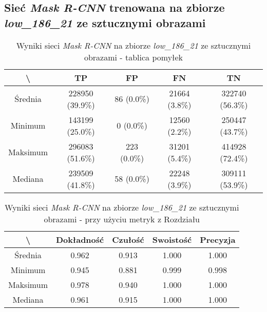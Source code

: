 \subsection{Sieć \textit{Mask R-CNN} trenowana na zbiorze \textit{low\_186\_21} ze sztucznymi obrazami}
\label{sec:results_low_original_generated}

\begin{table}[H]
	\centering
	\caption{Wyniki sieci \textit{Mask R-CNN} na zbiorze \textit{low\_186\_21} ze sztucznymi obrazami - tablica pomyłek}
	\vspace{6pt}
	{\footnotesize
		\begin{tabular}{|c|c|c|c|c|}
      \hline \textbackslash & TP & FP & FN & TN \\
      \hline Średnia & 228950 (39.9\%) & 86 (0.0\%) & 21664 (3.8\%) & 322740 (56.3\%) \\
      \hline Minimum & 143199 (25.0\%) & 0 (0.0\%) & 12560 (2.2\%) & 250447 (43.7\%) \\
      \hline Maksimum & 296083 (51.6\%) & 223 (0.0\%) & 31201 (5.4\%) & 414928 (72.4\%) \\
      \hline Mediana & 239509 (41.8\%) & 58 (0.0\%) & 22248 (3.9\%) & 309111 (53.9\%) \\
      \hline
		\end{tabular}
	}
  \vspace{0pt}
  \label{Tab:low_original_generated}
\end{table}


\begin{table}[H]
	\centering
	\caption{Wyniki sieci \textit{Mask R-CNN} na zbiorze \textit{low\_186\_21} ze sztucznymi obrazami - przy użyciu metryk z Rozdziału }
	\vspace{6pt}
	{\footnotesize
		\begin{tabular}{|c|c|c|c|c|}
      \hline \textbackslash & Dokładność & Czułość & Swoistość & Precyzja \\
      \hline Średnia & 0.962 & 0.913 & 1.000 & 1.000 \\
      \hline Minimum & 0.945 & 0.881 & 0.999 & 0.998 \\
      \hline Maksimum & 0.978 & 0.940 & 1.000 & 1.000 \\
      \hline Mediana & 0.961 & 0.915 & 1.000 & 1.000 \\
      \hline
		\end{tabular}
	}
  \vspace{0pt}
  \label{Tab:low_original_generated_calculated}
\end{table}

